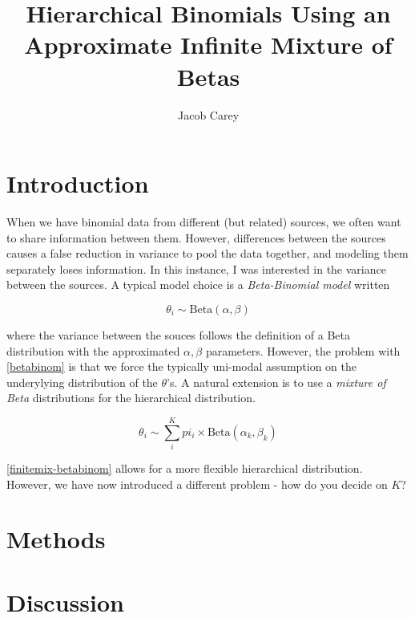 \documentclass{article}
\begin{document}
\title{Hierarchical Binomials Using an Approximate Infinite Mixture of Betas}
\author{Jacob Carey}

\maketitle

\section{Introduction}

When we have binomial data from different (but related) sources, we often want to share information between them. However, differences between the sources causes a false reduction in variance to pool the data together, and modeling them separately loses information. In this instance, I was interested in the variance between the sources. A typical model choice is a \textit{Beta-Binomial model} written

\begin{equation}\label{betabinom}
\theta_i \sim \text{Beta}(\alpha, \beta)
\end{equation}

where the variance between the souces follows the definition of a Beta distribution with the approximated $\alpha, \beta$ parameters. However, the problem with \eqref{betabinom} is that we force the typically uni-modal assumption on the underylying distribution of the $\theta$'s. A natural extension is to use a \textit{mixture of Beta} distributions for the hierarchical distribution.

\begin{equation}\label{finitemix-betabinom}
\theta_i \sim \sum_i^K pi_i \times \text{Beta}(\alpha_k, \beta_k)
\end{equation}

\eqref{finitemix-betabinom} allows for a more flexible hierarchical distribution. However, we have now introduced a different problem - how do you decide on $K$?

\section{Methods}

\section{Discussion}
\end{document}
